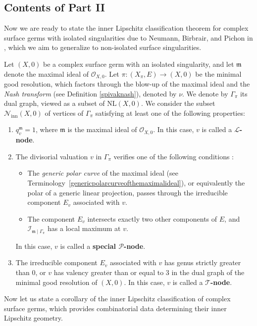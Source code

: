\documentclass[reqno,dvipsnames,12pt]{amsart}
\begin{document}
\subsection*{Contents of Part II}
Now we are ready to state the inner Lipschitz classification theorem for complex surface germs with isolated singularities due to Neumann, Birbrair, and Pichon in \cite{BNP}, which we aim to generalize to non-isolated surface singularities.

Let $(X,0)$ be a complex surface germ with an isolated singularity, and let $\mathfrak{m}$ denote the maximal ideal of $\mathcal{O}_{X,0}$. Let $ \pi : (X_\pi,E) \longrightarrow (X,0)$ be the minimal good resolution, which factors through the blow-up of the maximal ideal and the \textit{Nash transform} (see Definition \ref{spivaknash}), denoted by $\nu$. We denote by $\Gamma_{\pi}$ its dual graph, viewed as a subset of $\mathrm{NL}(X,0)$. We consider the subset $\mathcal{N}_{\mathrm{inn}}(X,0)$ of vertices of $\Gamma_{\pi}$ satisfying at least one of the following properties:
\begin{enumerate}
    \item $q_v^{\mathfrak{m}} = 1$, where $\mathfrak{m}$ is the maximal ideal of $\mathcal{O}_{X,0}$. In this case, $v$ is called a \textbf{$\mathcal{L}$-node}.
    \item The divisorial valuation  $v$ in $\Gamma_{\pi}$ verifies one of  the following conditions :
    \begin{itemize}
       \item The \textit{generic polar curve} of the maximal ideal (see Terminology~\ref{genericpolarcurveofthemaximalideal}), or equivalently the polar of a generic linear projection, passes through the irreducible component $E_v$ associated with $v$.
        \item The component $E_v$ intersects exactly two other components of $E$, and $\mathcal{I}_{\mathfrak{m}\mid \Gamma_{\pi}}$ has a local maximum at $v$.
    \end{itemize} In this case, $v$ is called a \textbf{special $\mathcal{P}$-node}.
    \item The irreducible component $E_v$ associated with $v$ has genus strictly greater than $0$, or $v$ has valency greater than or equal to $3$ in the dual graph of the minimal good resolution of $(X,0)$. In this case, $v$ is called a \textbf{$\mathcal{T}$-node}.
\end{enumerate}

Now let us state a corollary of the inner Lipschitz classification of complex surface germs, which provides combinatorial data determining their inner Lipschitz geometry.
\end{document}
